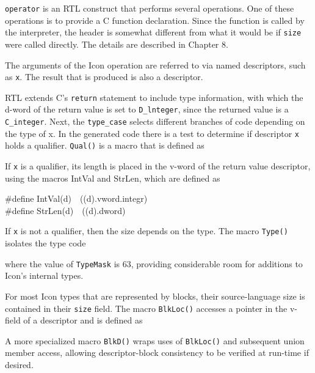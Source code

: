 \texttt{operator} is an RTL construct that performs several
operations. One of these operations is to provide a C function
declaration. Since the function is called by the interpreter, the
header is somewhat different from what it would be if \texttt{size}
were called directly. The details are described in Chapter 8.

The arguments of the Icon operation are referred to via named
descriptors, such as \texttt{x}. The result that is produced is also a
descriptor.

RTL extends C's \texttt{return} statement to include type information,
with which the d-word of the return value is set to
\texttt{D\_lnteger}, since the returned value is a
\texttt{C\_integer}. Next, the \texttt{type\_case} selects different
branches of code depending on the type of x. In the generated code
there is a test to determine if descriptor \texttt{x} holds a
qualifier. \texttt{Qual()} is a macro that is defined as


If \texttt{x} is a qualifier, its length is placed in the v-word of
the return value descriptor, using the macros IntVal and StrLen, which
are defined as

\begin{iconcode}
\>\#define IntVal(d)\ \ ((d).vword.integr)\\
\>\#define StrLen(d)\ \ ((d).dword)
\end{iconcode}

If \texttt{x} is not a qualifier, then the size depends on the
type. The macro \texttt{Type()} isolates the type code


\noindent where the value of \texttt{TypeMask} is 63, providing
considerable room for additions to Icon's internal types.

For most Icon types that are represented by blocks, their
source-language size is contained in their \texttt{size} field. The
macro \texttt{BlkLoc()} accesses a pointer in the v-field of a
descriptor and is defined as


A more specialized macro \texttt{BlkD()} wraps uses of
\texttt{BlkLoc()} and subsequent union member access, allowing
descriptor-block consistency to be verified at run-time if desired.


